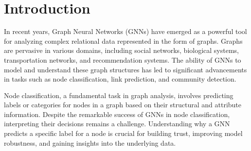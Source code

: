 \documentclass[binding=0.6cm]{sapthesis}
\begin{document}
\begin{abstract}
\end{abstract}

\tableofcontents
\mainmatter

\chapter{Introduction}
\label{chap:1-intro} 
In recent years, Graph Neural Networks (GNNs) have emerged as a powerful tool for analyzing complex relational data represented in the form of graphs. Graphs are pervasive in various domains, including social networks, biological systems, transportation networks, and recommendation systems. The ability of GNNs to model and understand these graph structures has led to significant advancements in tasks such as node classification, link prediction, and community detection.

Node classification, a fundamental task in graph analysis, involves predicting labels or categories for nodes in a graph based on their structural and attribute information. Despite the remarkable success of GNNs in node classification, interpreting their decisions remains a challenge. Understanding why a GNN predicts a specific label for a node is crucial for building trust, improving model robustness, and gaining insights into the underlying data.
\end{document}
